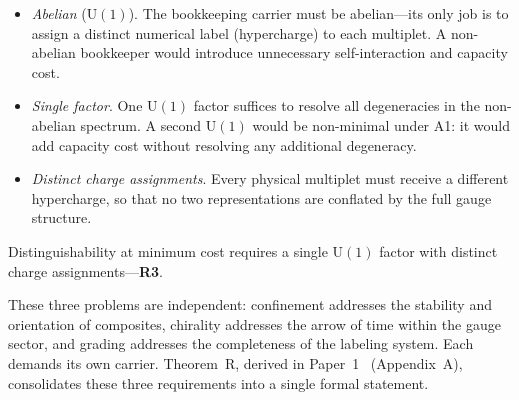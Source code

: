 \documentclass[11pt]{article}
\newenvironment{varlist}{\begin{itemize}[nosep,leftmargin=2em]}{\end{itemize}}
\newcommand{\U}{\mathrm{U}}
\begin{document}
\begin{varlist}
\item \textit{Abelian} ($\U(1)$).  The bookkeeping carrier must be abelian---its only job is to assign a distinct numerical label (hypercharge) to each multiplet.  A non-abelian bookkeeper would introduce unnecessary self-interaction and capacity cost.
\item \textit{Single factor}.  One $\U(1)$ factor suffices to resolve all degeneracies in the non-abelian spectrum.  A second $\U(1)$ would be non-minimal under A1: it would add capacity cost without resolving any additional degeneracy.
\item \textit{Distinct charge assignments}.  Every physical multiplet must receive a different hypercharge, so that no two representations are conflated by the full gauge structure.
\end{varlist}

\noindent Distinguishability at minimum cost requires a single $\U(1)$ factor with distinct charge assignments---\textbf{R3}.

\medskip
These three problems are independent: confinement addresses the stability and orientation of composites, chirality addresses the arrow of time within the gauge sector, and grading addresses the completeness of the labeling system.  Each demands its own carrier.  Theorem~R, derived in Paper~1~\cite{BrookePaper1} (Appendix~A), consolidates these three requirements into a single formal statement.
\end{document}
